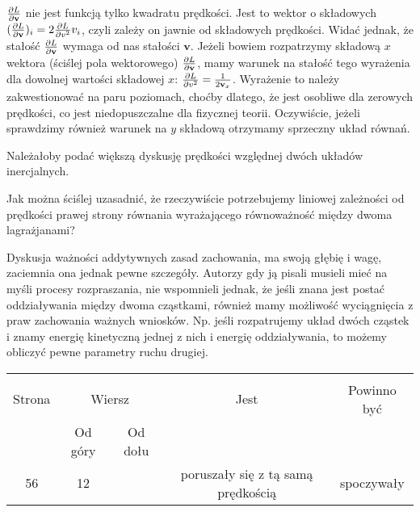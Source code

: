 \documentclass[a4paper,11pt]{article}
\begin{document}
\start {} $\frac{ \partial L }{ \partial \mathbf{v} }$ nie jest funkcją tylko
kwadratu prędkości. Jest to wektor o składowych
$( \frac{ \partial L }{ \partial \mathbf{v} } )_{ i } = 2 \frac{
  \partial L }{ \partial { v^{ 2 } } } v_{ i }$, czyli zależy on
jawnie od składowych prędkości. Widać jednak, że stałość
$\frac{ \partial L }{ \partial \mathbf{v} }$ wymaga od nas stałości
$\mathbf{ v }$. Jeżeli bowiem rozpatrzymy składową $x$ wektora
(ściślej pola wektorowego)
$\frac{ \partial L }{ \partial \mathbf{v} }$, mamy warunek na stałość
tego wyrażenia dla dowolnej wartości składowej $x$:
$\frac{ \partial L }{ \partial { v^{ 2 } } } = \frac{ 1 }{ 2
  \mathbf{v}_{ x } }$. Wyrażenie to należy zakwestionować na paru
poziomach, choćby dlatego, że jest osobliwe dla zerowych prędkości, co
jest niedopuszczalne dla fizycznej teorii. Oczywiście, jeżeli
sprawdzimy również warunek na $y$ składową otrzymamy sprzeczny układ
równań.

\vspace{\spaceFour}



\start {} Należałoby podać większą dyskusję prędkości względnej
dwóch układów inercjalnych.

\vspace{\spaceFour}



\start {} Jak można ściślej uzasadnić, że rzeczywiście
potrzebujemy liniowej zależności od prędkości prawej strony równania
wyrażającego równoważność między dwoma lagrażjanami? \Dok

\vspace{\spaceFour}



\start {} Dyskusja ważności addytywnych zasad zachowania, ma
swoją głębię i wagę, zaciemnia ona jednak pewne szczegóły. Autorzy gdy
ją pisali musieli mieć na myśli procesy rozpraszania, nie wspomnieli
jednak, że jeśli znana jest postać oddziaływania między dwoma
cząstkami, również mamy możliwość wyciągnięcia z praw zachowania
ważnych wniosków. Np. jeśli rozpatrujemy układ dwóch cząstek i znamy
energię kinetyczną jednej z nich i energię oddziaływania, to możemy
obliczyć pewne parametry ruchu drugiej.







\begin{center}

  \begin{tabular}{|c|c|c|c|c|}
    \hline
    & \multicolumn{2}{c|}{} & & \\
    Strona & \multicolumn{2}{c|}{Wiersz} & Jest
                              & Powinno być \\ \cline{2-3}
    & Od góry & Od dołu & & \\
    \hline
    56  & 12 & & poruszały się z tą samą prędkością & spoczywały \\
    \hline
  \end{tabular}

\end{center}
\end{document}

